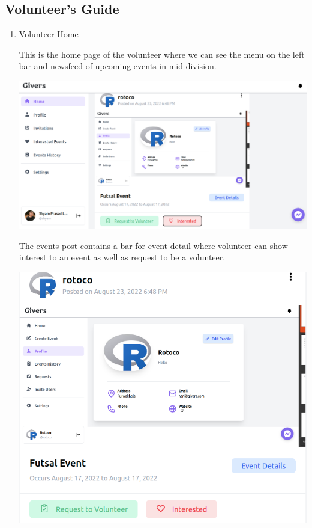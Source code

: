 \documentclass[12pt]{article}
\begin{document}
\subsection{Volunteer's Guide}
\begin{enumerate}
	\item Volunteer Home
	
	This is the home page of the volunteer where we can see the menu on the left bar and newsfeed of upcoming events in mid division. 

	\includegraphics[scale = 0.35]{user/user_home.png}
	
	The events post contains a bar for event detail where volunteer can show interest to an event as well as request to be a volunteer.	
	\begin{center}
	
	\includegraphics[scale = 0.35]{user/event_post.png}
	

\end{center}
\end{enumerate}
\end{document}
